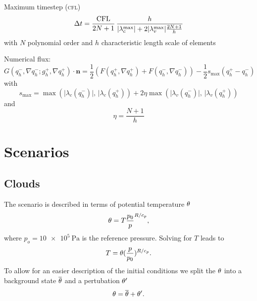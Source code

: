 Maximum timestep (\textsc{cfl})
\begin{equation}
 \Delta t = \frac{\text{CFL}}{2N + 1} \, \frac{h}{\vert \lambda_c^{\text{max}} \vert + 2 \vert \lambda_v^{\text{max}} \vert \frac{2N+1}{h}}
\end{equation}
with $N$ polynomial order and $h$ characteristic length scale of elements

Numerical flux:
\begin{equation}
  \label{eq:rusanov-flux}
  G(q_h^-, \nabla q_h^-; g_h^+, \nabla q_h^+) \cdot \bm{n} =
  \frac{1}{2} \left(
    F(q_h^+, \nabla q_h^+) +
    F(q_h^-, \nabla q_h^-)
  \right) -
  \frac{1}{2} s_\text{max} (q_h^+ - q_h^-)
\end{equation}
with
\begin{equation}
  \label{eq:parabolic-penalty}
  s_\text{max}  = \max \left(
\vert \lambda_c(q_h^-) \vert, \, \vert \lambda_c(q_h^+)
\right) +
2 \eta \max \left(
\vert \lambda_v(q_h^-) \vert, \, \vert \lambda_v(q_h^+)
\right)
\end{equation}
and
\begin{equation}
  \eta = \frac{N+1}{h}
\end{equation}


\section{Scenarios}\label{sec:scenarios}

\subsection{Clouds}
The scenario is described in terms of potential temperature $\theta$
\begin{equation}
  \theta = T \frac{p_0}{p}^{R/c_p},
\end{equation}
where $p_o = \SI{10e5}{\Pa}$ is the reference pressure.
Solving for $T$ leads to
\begin{equation}
  \label{eq:potTToT}
  T = \theta (\frac{p}{p_0})^{R/c_p}.
\end{equation}
To allow for an easier description of the initial conditions we split the $\theta$ into a background state $\overline{\theta}$ and a pertubation $\theta'$
\begin{equation}
  \label{eq:potT-split}
  \theta = \overline{\theta} + \theta'.
\end{equation}


